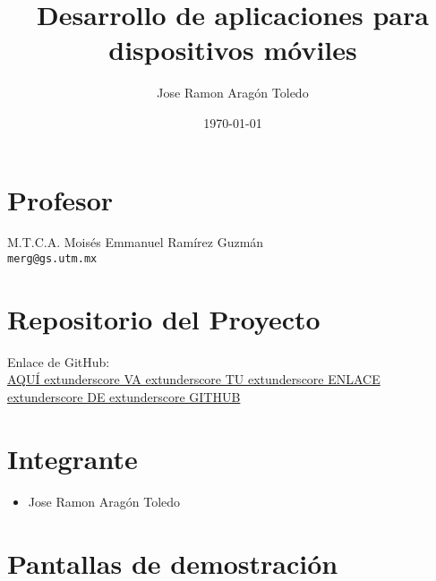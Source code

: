 \documentclass[12pt]{article}
\title{Desarrollo de aplicaciones para dispositivos móviles}
\author{Jose Ramon Aragón Toledo}
\date{\today}
\begin{document}
\maketitle

\section*{Profesor}
M.T.C.A. Moisés Emmanuel Ramírez Guzmán \\ 
\texttt{merg@gs.utm.mx}

\section*{Repositorio del Proyecto}
Enlace de GitHub: \\ 
\url{AQUÍ	extunderscore VA	extunderscore TU	extunderscore ENLACE	extunderscore DE	extunderscore GITHUB}

\section*{Integrante}
\begin{itemize}
    \item Jose Ramon Aragón Toledo
\end{itemize}

\section*{Pantallas de demostración}
\begin{figure}[h!]
    \centering
\end{figure}
\begin{figure}[h!]
    \centering
\end{figure}
\begin{figure}[h!]
    \centering
\end{figure}
\end{document}
